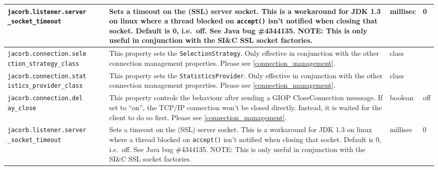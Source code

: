 {{\begin{small}
\begin{longtable}{|p{5cm}|p{7.5cm}|p{1.5cm}|p{1.5cm}|}
\hline
\verb"jacorb.listener.server"
\verb"_socket_timeout" & Sets a timeout on the (SSL) server socket. This is a
workaround for JDK 1.3 on linux where a thread blocked on \verb"accept()"
isn't notified when closing that socket. Default is 0, i.e.~off. See Java bug
\#4344135. NOTE: This is only useful in conjunction with the SI\&C SSL socket
factories. & millisec & 0\\
\hline
\verb"jacorb.connection.sele"
\verb"ction_strategy_class" & This property sets
  the {\tt Selection\-Strategy}. Only effective in conjunction with the other
  connection management  properties. Please see \ref{connection_management}. &
  class & \\
\hline
\verb"jacorb.connection.stat"
\verb"istics_provider_class" & This property sets
  the {\tt Statistics\-Provider}. Only effective in conjunction with the other
  connection management properties. Please see \ref{connection_management}. &
  class & \\

\hline
\verb"jacorb.connection.del"
\verb"ay_close" & This property controls the behaviour after sending a GIOP
CloseConnection messsage. If set to ``on'', the TCP/IP connection won't be
closed directly. Instead, it is waited for the client to do so
first. Please see \ref{connection_management}. & boolean & off \\
\hline

\verb"jacorb.listener.server"
\verb"_socket_timeout" & Sets a timeout on the (SSL) server socket. This is a
workaround for JDK 1.3 on linux where a thread blocked on \verb"accept()"
isn't notified when closing that socket. Default is 0, i.e.~off. See Java bug
\#4344135. NOTE: This is only useful in conjunction with the SI\&C SSL socket
factories. & millisec & 0\\
\hline


\end{longtable}
\end{small}}}
